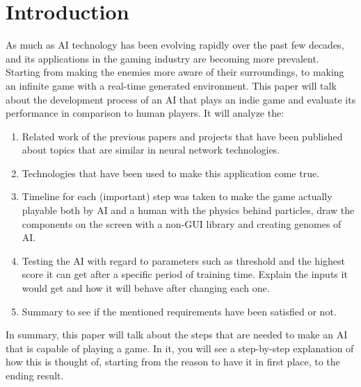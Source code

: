 \chapter{Introduction}
As much as AI technology has been evolving rapidly over the past few decades, and its applications in the gaming industry are becoming more prevalent. Starting from making the enemies more aware of their surroundings, to making an infinite game with a real-time generated environment. This paper will talk about the development process of an AI that plays an indie game and evaluate its performance in comparison to human players. It will  analyze the:

\begin{enumerate}
\item Related work of the previous papers and projects that have been published about topics that are similar in neural network technologies.
\item Technologies that have been used to make this application come true.
\item Timeline for each (important) step was taken to make the game actually playable both by AI and a human with the physics behind particles, draw the components on the screen with a non-GUI library and creating genomes of AI.
\item Testing the AI with regard to parameters such as threshold and the highest score it can get after a specific period of training time. Explain the inputs it would get and how it will behave after changing each one.
\item Summary to see if the mentioned requirements have been satisfied or not.
\end{enumerate}

In summary, this paper will talk about the steps that are needed to make an AI that is capable of playing a game. In it, you will see a step-by-step explanation of how this is thought of, starting from the reason to have it in first place, to the ending result.
